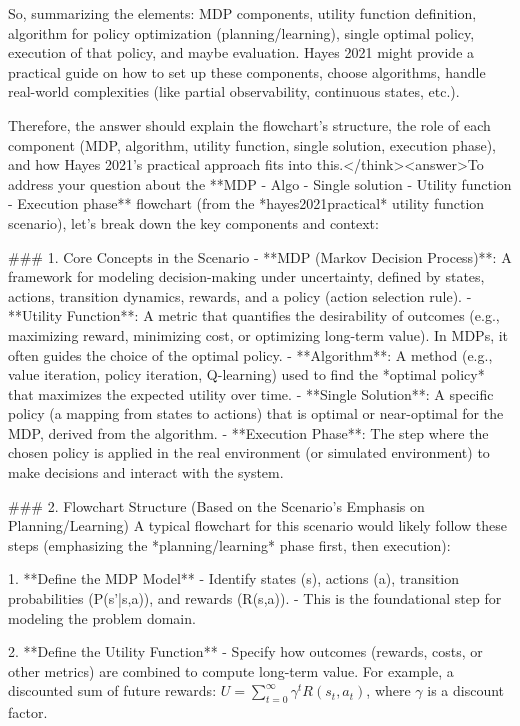 So, summarizing the elements: MDP components, utility function definition, algorithm for policy optimization (planning/learning), single optimal policy, execution of that policy, and maybe evaluation. Hayes 2021 might provide a practical guide on how to set up these components, choose algorithms, handle real-world complexities (like partial observability, continuous states, etc.).

Therefore, the answer should explain the flowchart's structure, the role of each component (MDP, algorithm, utility function, single solution, execution phase), and how Hayes 2021's practical approach fits into this.</think><answer>To address your question about the **MDP - Algo - Single solution - Utility function - Execution phase** flowchart (from the *hayes2021practical* utility function scenario), let’s break down the key components and context:  


### 1. Core Concepts in the Scenario  
- **MDP (Markov Decision Process)**: A framework for modeling decision-making under uncertainty, defined by states, actions, transition dynamics, rewards, and a policy (action selection rule).  
- **Utility Function**: A metric that quantifies the desirability of outcomes (e.g., maximizing reward, minimizing cost, or optimizing long-term value). In MDPs, it often guides the choice of the optimal policy.  
- **Algorithm**: A method (e.g., value iteration, policy iteration, Q-learning) used to find the *optimal policy* that maximizes the expected utility over time.  
- **Single Solution**: A specific policy (a mapping from states to actions) that is optimal or near-optimal for the MDP, derived from the algorithm.  
- **Execution Phase**: The step where the chosen policy is applied in the real environment (or simulated environment) to make decisions and interact with the system.  


### 2. Flowchart Structure (Based on the Scenario’s Emphasis on Planning/Learning)  
A typical flowchart for this scenario would likely follow these steps (emphasizing the *planning/learning* phase first, then execution):  

1. **Define the MDP Model**  
   - Identify states (s), actions (a), transition probabilities (P(s’|s,a)), and rewards (R(s,a)).  
   - This is the foundational step for modeling the problem domain.  

2. **Define the Utility Function**  
   - Specify how outcomes (rewards, costs, or other metrics) are combined to compute long-term value. For example, a discounted sum of future rewards: \( U = \sum_{t=0}^\infty \gamma^t R(s_t, a_t) \), where \( \gamma \) is a discount factor.  

